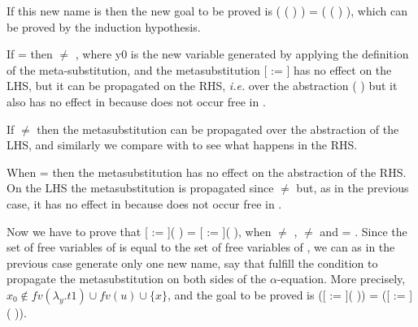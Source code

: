 \begin{coqdoccode}
\end{coqdoccode}
If this new name is  then the new goal to be proved is   ( (   )  ) =   ( (   )  ), which can be proved by the induction hypothesis. 
\begin{coqdoccode}
\end{coqdoccode}
If  =  then  \ensuremath{\not=} , where y0 is the new variable generated by applying the definition of the meta-substitution, and the metasubstitution [ := ] has no effect on the LHS, but it can be propagated on the RHS, {\it i.e.} over the abstraction (  ) but it also has no effect in  because  does not occur free in . 
\begin{coqdoccode}
\end{coqdoccode}
If  \ensuremath{\not=}  then the metasubstitution can be propagated over the abstraction of the LHS, and similarly we compare  with  to see what happens in the RHS. 
\begin{coqdoccode}
\end{coqdoccode}
When  =  then the metasubstitution has no effect on the abstraction of the RHS. On the LHS the metasubstitution is propagated since  \ensuremath{\not=}  but, as in the previous case, it has no effect in  because  does not occur free in .
\begin{coqdoccode}
\end{coqdoccode}
Now we have to prove that [ := ](  ) = [ := ](  ), when  \ensuremath{\not=} ,  \ensuremath{\not=}  and    =   . Since the set of free variables of    is equal to the set of free variables of   , we can as in the previous case generate only one new name, say  that fulfill the condition to propagate the metasubstitution on both sides of the $\alpha$-equation. More precisely, $x_0 \notin fv(\lambda_y.t1) \cup fv(u) \cup \{x\}$, and the goal to be proved is   ([ := ](   )) =   ([ := ](   )).
